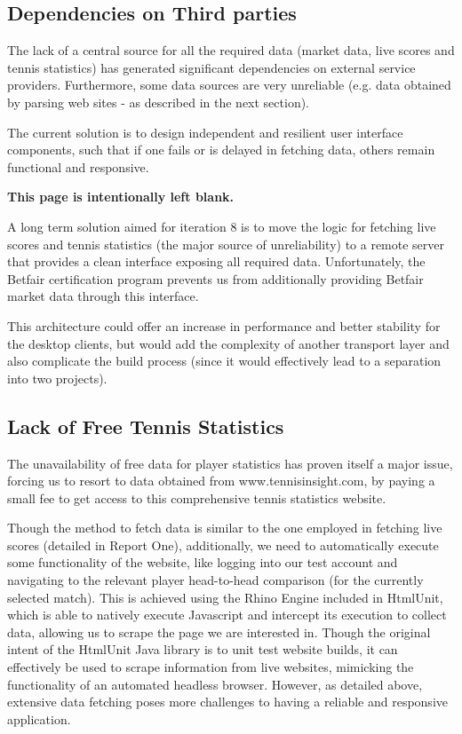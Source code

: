 \documentclass[10pt]{report}
\begin{document}
\subsection{Dependencies on Third parties}
The lack of a central source for all the required data (market data, live scores and tennis statistics) has generated significant dependencies on external service providers. Furthermore, some data sources are very unreliable (e.g. data obtained by parsing web sites - as described in the next section).

The current solution is to design independent and resilient user interface components, such that if one fails or is delayed in fetching data, others remain functional and responsive.

\pagebreak
{\bf This page is intentionally left blank.}
\pagebreak

A long term solution aimed for iteration 8 is to move the logic for fetching live scores and tennis statistics (the major source of unreliability) to a remote server that provides a clean interface exposing all required data. Unfortunately, the Betfair certification program prevents us from additionally providing Betfair market data through this interface.

This architecture could offer an increase in performance and better stability for the desktop clients, but would add the complexity of another transport layer and also complicate the build process (since it would effectively lead to a separation into two projects).

\subsection{Lack of Free Tennis Statistics}
The unavailability of free data for player statistics has proven itself a major issue, forcing us to resort to data obtained from www.tennisinsight.com, by paying a small fee to get access to this comprehensive tennis statistics website. 

Though the method to fetch data is similar to the one employed in fetching live scores (detailed in Report One), additionally, we need to automatically execute some functionality of the website, like logging into our test account and navigating to the relevant player head-to-head comparison (for the currently selected match). This is achieved using the Rhino Engine included in HtmlUnit, which is able to natively execute Javascript and intercept its execution to collect data, allowing us to scrape the page we are interested in. Though the original intent of the HtmlUnit Java library is to unit test website builds, it can effectively be used to scrape information from live websites, mimicking the functionality of an automated headless browser. However, as detailed above, extensive data fetching poses more challenges to having a reliable and responsive application.
\end{document}
